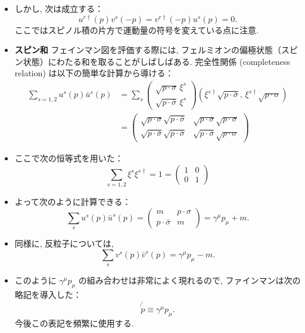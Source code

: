 \documentclass[a4paper,12pt]{article}
\newcommand{\slashed}[1]{\not{#1}}
\begin{document}
\begin{itemize}
  \item しかし, 次は成立する：
  \begin{equation*}
    u^{r\dagger}(p) v^s(-p) = v^{r\dagger}(-p) u^s(p) = 0. \tag{3.65}
  \end{equation*}
  ここではスピノル積の片方で運動量の符号を変えている点に注意.
  \item \textbf{スピン和}  
  フェインマン図を評価する際には, フェルミオンの偏極状態（スピン状態）にわたる和を取ることがしばしばある.
  完全性関係 (completeness relation) は以下の簡単な計算から導ける：
  \begin{align*}
    \sum_{s=1,2} u^s(p) \bar{u}^s(p)
    &= \sum_s
    \begin{pmatrix}
      \sqrt{p \cdot \sigma} \, \xi^s \\
      \sqrt{p \cdot \bar{\sigma}} \, \xi^s
    \end{pmatrix}
    \left(
      \xi^{s\dagger} \sqrt{p \cdot \bar{\sigma}},\,
      \xi^{s\dagger} \sqrt{p \cdot \sigma}
    \right) \\
    &=
    \begin{pmatrix}
      \sqrt{p \cdot \sigma} \sqrt{p \cdot \bar{\sigma}} &
      \sqrt{p \cdot \sigma} \sqrt{p \cdot \sigma} \\
      \sqrt{p \cdot \bar{\sigma}} \sqrt{p \cdot \bar{\sigma}} &
      \sqrt{p \cdot \bar{\sigma}} \sqrt{p \cdot \sigma}
    \end{pmatrix}
  \end{align*}

  \item ここで次の恒等式を用いた：
  \begin{equation*}
    \sum_{s=1,2} \xi^s \xi^{s\dagger} = 1 =
    \begin{pmatrix}
      1 & 0 \\
      0 & 1
    \end{pmatrix}
  \end{equation*}

  \item よって次のように計算できる：
  \begin{equation*}
    \sum_s u^s(p) \bar{u}^s(p)
    =
    \begin{pmatrix}
      m & p \cdot \sigma \\
      p \cdot \bar{\sigma} & m
    \end{pmatrix}
    = \gamma^\mu p_\mu + m. \tag{3.66}
  \end{equation*}

  \item 同様に, 反粒子については,
  \begin{equation*}
    \sum_s v^s(p) \bar{v}^s(p)
    = \gamma^\mu p_\mu - m. \tag{3.67}
  \end{equation*}

  \item このように $\gamma^\mu p_\mu$ の組み合わせは非常によく現れるので, ファインマンは次の略記を導入した：
  \begin{equation*}
    \slashed{p} \equiv \gamma^\mu p_\mu.
  \end{equation*}
  今後この表記を頻繁に使用する.
\end{itemize}
\end{document}
